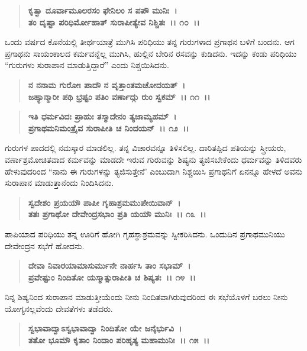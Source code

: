 \begin{verse}
\textbf{ಕೃತ್ವಾ ದೂರ್ವಾಮೂಲರಸಂ ಫೇನಿಲಂ ಸ ಪಪೌ ಮುನಿಃ~।}\\\textbf{ತಂ ದೃಷ್ಟಾ ಪರಿಧಿರ್ಮೋಹಾತ್ ಸುರಾಪೀತ್ಯೇವ ನಿಶ್ಚಿತಃ~।। ೧೦~।।}
\end{verse}

ಒಂದು ವರ್ಷದ ಕೊನೆಯಲ್ಲಿ ತೀರ್ಥಯಾತ್ರೆ ಮುಗಿಸಿ ಪರಿಧಿಯು ತನ್ನ ಗುರುಗಳಾದ ಪ್ರಗಾಥನ ಬಳಿಗೆ ಬಂದನು. ಆಗ ಪ್ರಗಾಥನು ಸಾಯಂಕಾಲದ ಕರ್ಮವನ್ನೆಲ್ಲ ಮುಗಿಸಿ, ಹುಲ್ಲಿನ ಬೇರಿನ ರಸವನ್ನು ಕುಡಿದನು. ಇದನ್ನು ಕಂಡು ಪರಿಧಿಯು “ಗುರುಗಳು ಸುರಾಪಾನ ಮಾಡುತ್ತಿದ್ದಾರೆ” ಎಂದು ನಿಶ್ಚಯಿಸಿದನು.

\begin{verse}
\textbf{ನ ನನಾಮ ಗುರೋಃ ಪಾದೌ ನ ವೃತ್ತಾಂತಮಚೋದಯತ್~।}\\\textbf{ಜಹ್ಯಾನ್ಮಾರೀ ಪಥಿ ಭ್ರಷ್ಟಂ ಪತಿಂ ವರ್ಣಾದ್ಗು ರುಂ ಸ್ವಕಮ್~।। ೧೧~।। }
\end{verse}

\begin{verse}
\textbf{ಇತಿ ಧರ್ಮವಿದಃ ಪ್ರಾಹುಃ ತಸ್ಮಾದೇನಂ ತ್ಯಜಾಮ್ಯಹಮ್~।}\\\textbf{ಪ್ರಗಾಥಮನಿಮಂತ್ರೈವ ಸುರಾಪೀತಿ ಚ ನಿಂದಯನ್~।। ೧೨~।।}
\end{verse}

ಗುರುಗಳ ಪಾದದಲ್ಲಿ ನಮಸ್ಕಾರ ಮಾಡಲಿಲ್ಲ. ತನ್ನ ವಿಚಾರವನ್ನೂ ತಿಳಿಸಲಿಲ್ಲ. ದಾರಿತಪ್ಪಿದ ಪತಿಯನ್ನು ಸ್ತ್ರೀಯರು, ವರ್ಣಾಶ್ರಮೋಚಿತವಾದ ಕರ್ಮವನ್ನು ಮಾಡದೇ ಇರುವ ಗುರುವನ್ನು ಶಿಷ್ಯನು ತ್ಯಜಿಸಬೇಕೆಂದು ಧರ್ಮವನ್ನು ತಿಳಿದವರು ಹೇಳುವುದರಿಂದ “ನಾನು ಈ ಗುರುಗಳನ್ನು ತ್ಯಜಿಸುತ್ತೇನೆ' ಎಂಬುದಾಗಿ ನಿಶ್ಚಯಿಸಿ ಪ್ರಗಾಥನಿಗೆ ಏನನ್ನೂ ಹೇಳದೆ ಅವನು ಸುರಾಪಾನ ಮಾಡುತ್ತಾನೆಂದು ನಿಂದಿಸಿದನು.

\begin{verse}
\textbf{ಸ್ವದೇಶಂ ಪ್ರಯಯೌ ಪಾಪೀ ಗೃಹಾಶ್ರಮಮುಪೇಯಿವಾನ್~।}\\\textbf{ತತಃ ಪ್ರಗಾಥೋ ದೇವೇಂದ್ರಸಭಾಂ ಪ್ರತಿ ಯಯೌ ಮುನಿಃ~।। ೧೩~।।}
\end{verse}

ಪಾಪಿಯಾದ ಪರಿಧಿಯು ತನ್ನ ಊರಿಗೆ ಹೋಗಿ ಗೃಹಸ್ಥಾಶ್ರಮವನ್ನು ಸ್ವೀಕರಿಸಿದನು. ಒಂದುದಿನ ಪ್ರಗಾಥಮುನಿಯು ದೇವೇಂದ್ರನ ಸಭೆಗೆ ಹೋದನು.

\begin{verse}
\textbf{ದೇವಾ ನಿವಾರಯಾಮಾಸುರ್ಮುನೇ ನಾರ್ಹಸಿ ತಾಂ ಸಭಾಮ್~।}\\\textbf{ಪ್ರವೇಷ್ಟುಂ ನಿಂದಿತೋ ಯಸ್ಮಾತ್ಸುರಾಪೀತಿ ಚ ಶಿಷ್ಯತಃ~।। ೧೪~।।}
\end{verse}

ನಿನ್ನ ಶಿಷ್ಯನಿಂದ ಸುರಾಪಾನ ಮಾಡುತ್ತೀಯೆಂದು ನೀನು ನಿಂದಿತವಾಗಿರುವುದರಿಂದ ಈ ಸಭೆಯೊಳಗೆ ಬರಲು ನೀನು ಯೋಗ್ಯನಲ್ಲವೆಂದು ದೇವತೆಗಳು ತಡೆದರು.

\begin{verse}
\textbf{ಸ್ವಭಾವಾದ್ವಾಽಸ್ವಭಾವಾದ್ವಾ ನಿಂದಿತೋ ಯೇ ಜನೈರ್ಭುವಿ~।}\\\textbf{ತತೋ ಭೂಮೌ ಕೃತಾಂ ನಿಂದಾಂ ಪರಿಹೃತ್ಯ ಮಹಾಮುನಿಃ~।। ೧೫~।। }
\end{verse}

